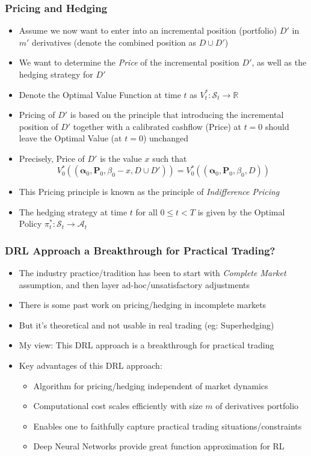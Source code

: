 \documentclass[handout]{beamer}
\begin{document}
\begin{frame}
\frametitle{Pricing and Hedging}
\pause
\begin{itemize}[<+->]
\item Assume we now want to enter into an incremental position (portfolio) $D'$ in $m'$ derivatives (denote the combined position as $D \cup D'$)
\item We want to determine the {\em Price} of the incremental position $D'$, as well as the hedging strategy for $D'$
\item Denote the Optimal Value Function at time $t$ as $V_t^* : \mathcal{S}_t \rightarrow \mathbb{R}$
\item Pricing of $D'$ is based on the principle that introducing the incremental position of $D'$ together with a calibrated cashflow (Price) at $t=0$ should leave the Optimal Value (at $t=0$) unchanged
\item Precisely, Price of $D'$ is the value $x$ such that
$$V_0^*((\bm{\alpha}_0, \bm{P}_0, \beta_0 - x, D \cup D')) = V_0^*((\bm{\alpha}_0, \bm{P}_0, \beta_0, D))$$
\item This Pricing principle is known as the principle of {\em Indifference Pricing}
\item The hedging strategy at time $t$ for all $0 \leq t < T$ is given by the Optimal Policy $\pi_t^* : \mathcal{S}_t \rightarrow \mathcal{A}_t$
\end{itemize}
\end{frame}

\begin{frame}
\frametitle{DRL Approach a Breakthrough for Practical Trading?}
\pause
\begin{itemize}[<+->]
\item The industry practice/tradition has been to start with {\em Complete Market} assumption, and then layer ad-hoc/unsatisfactory adjustments
\item There is some past work on pricing/hedging in incomplete markets
\item But it's theoretical and not usable in real trading (eg: Superhedging)
\item My view: This DRL approach is a breakthrough for practical trading
\item Key advantages of this DRL approach:
\begin{itemize}
\item Algorithm for pricing/hedging independent of market dynamics
\item Computational cost scales efficiently with size $m$ of derivatives portfolio
\item Enables one to faithfully capture practical trading situations/constraints
\item Deep Neural Networks provide great function approximation for RL 
\end{itemize}
\end{itemize}

\end{frame}
\end{document}
